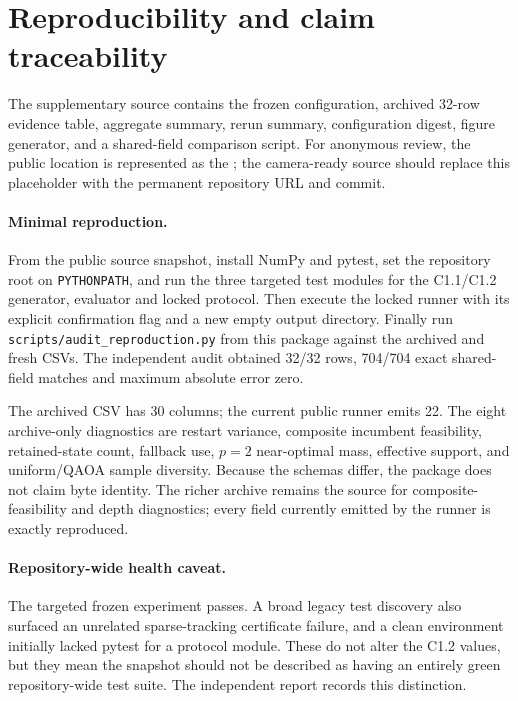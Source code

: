 \section{Reproducibility and claim traceability}
\label{app:reproducibility}

The supplementary source contains the frozen configuration, archived 32-row evidence table, aggregate summary, rerun summary, configuration digest, figure generator, and a shared-field comparison script. For anonymous review, the public location is represented as the \Repo; the camera-ready source should replace this placeholder with the permanent repository URL and commit.

\paragraph{Minimal reproduction.}
From the public source snapshot, install NumPy and pytest, set the repository root on \texttt{PYTHONPATH}, and run the three targeted test modules for the C1.1/C1.2 generator, evaluator and locked protocol. Then execute the locked runner with its explicit confirmation flag and a new empty output directory. Finally run \texttt{scripts/audit\_reproduction.py} from this package against the archived and fresh CSVs. The independent audit obtained 32/32 rows, 704/704 exact shared-field matches and maximum absolute error zero.

The archived CSV has 30 columns; the current public runner emits 22. The eight archive-only diagnostics are restart variance, composite incumbent feasibility, retained-state count, fallback use, $p=2$ near-optimal mass, effective support, and uniform/QAOA sample diversity. Because the schemas differ, the package does not claim byte identity. The richer archive remains the source for composite-feasibility and depth diagnostics; every field currently emitted by the runner is exactly reproduced.



\paragraph{Repository-wide health caveat.}
The targeted frozen experiment passes. A broad legacy test discovery also surfaced an unrelated sparse-tracking certificate failure, and a clean environment initially lacked pytest for a protocol module. These do not alter the C1.2 values, but they mean the snapshot should not be described as having an entirely green repository-wide test suite. The independent report records this distinction.
